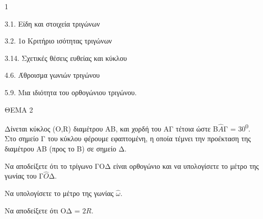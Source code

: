 \begin{ylh}{1}
    \item 3.1. Είδη και στοιχεία τριγώνων
    \item 3.2. 1ο Κριτήριο ισότητας τριγώνων
    \item 3.14. Σχετικές θέσεις ευθείας και κύκλου
    \item 4.6. Άθροισμα γωνιών τριγώνου
    \item 5.9. Μια ιδιότητα του ορθογώνιου τριγώνου.
\end{ylh}

ΘΕΜΑ 2

Δίνεται κύκλος (Ο,R) διαμέτρου ΑΒ, και χορδή του ΑΓ τέτοια ώστε Β$\widehat{Α}$Γ = 30\textsuperscript{0}. Στο σημείο Γ του κύκλου φέρουμε εφαπτομένη, η οποία τέμνει την προέκταση της διαμέτρου ΑΒ (προς το Β) σε σημείο Δ.

\begin{alist}
\item Να αποδείξετε ότι το τρίγωνο ΓΟΔ είναι ορθογώνιο και να υπολογίσετε το μέτρο της γωνίας του Γ$\widehat{Ο}$Δ. 

\item Να υπολογίσετε το μέτρο της γωνίας $\widehat{\omega}$. 

\item Να αποδείξετε ότι ΟΔ = $2R$. 


\begin{center}
\end{center}
\end{alist}
